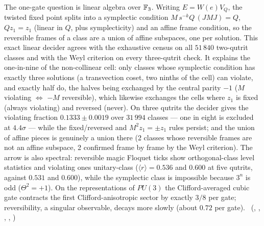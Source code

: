 The one-gate question is linear algebra over $\mathbb{F}_3$. Writing $E=W(e)V_Q$, the twisted fixed point splits into a
symplectic condition $M\,s^{-k}Q\,(JMJ)=Q$, $Qz_1=z_1$ (linear in $Q$, plus symplecticity) and an affine frame
condition, so the reversible frames of a class are a union of affine subspaces, one per solution. This exact linear
decider agrees with the exhaustive census on all $51\,840$ two-qutrit classes and with the Weyl criterion on every
three-qutrit check. It explains the one-in-nine of the non-collinear cell: only classes whose symplectic condition has
exactly three solutions (a transvection coset, two ninths of the cell) can violate, and exactly half do, the halves
being exchanged by the central parity $-1$ ($M$ violating $\Leftrightarrow$ $-M$ reversible), which likewise exchanges
the cells where $z_1$ is fixed (always violating) and reversed (never). On three qutrits the decider gives the
violating fraction $0.1333\pm0.0019$ over $31\,994$
classes --- one in eight is excluded at $4.4\sigma$ --- while the fixed/reversed and
$M^2z_1=\pm z_1$ rules persist; and the union of affine pieces is genuinely a union there (2 classes whose
reversible frames are not an affine subspace, 2 confirmed frame by frame by the Weyl criterion).
The arrow is also spectral: reversible magic Floquet ticks show orthogonal-class level statistics and violating ones
unitary-class ($\langle r\rangle=0.536$ and $0.600$ at five qutrits, against $0.531$ and $0.600$), while the symplectic
class is impossible because $3^n$ is odd ($\Theta^2=+1$). On the representations of $PU(3)$ the Clifford-averaged cubic
gate contracts the first Clifford-anisotropic sector by exactly $3/8$ per gate; reversibility, a singular observable,
decays more slowly (about $0.72$ per gate). \tierC\ (,
, ,
, )


